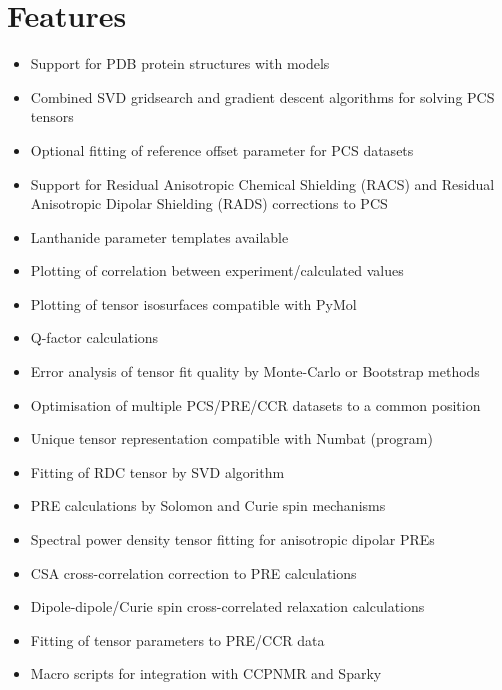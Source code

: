 \documentclass[a4paper,10pt,english,openany,oneside]{sphinxmanual}
\begin{document}
\chapter{Features}
\label{\detokenize{index:features}}\begin{itemize}
\item {} 
Support for PDB protein structures with models

\item {} 
Combined SVD gridsearch and gradient descent algorithms for solving PCS tensors

\item {} 
Optional fitting of reference offset parameter for PCS datasets

\item {} 
Support for Residual Anisotropic Chemical Shielding (RACS) and Residual Anisotropic Dipolar Shielding (RADS) corrections to PCS

\item {} 
Lanthanide parameter templates available

\item {} 
Plotting of correlation between experiment/calculated values

\item {} 
Plotting of tensor isosurfaces compatible with PyMol

\item {} 
Q-factor calculations

\item {} 
Error analysis of tensor fit quality by Monte-Carlo or Bootstrap methods

\item {} 
Optimisation of multiple PCS/PRE/CCR datasets to a common position

\item {} 
Unique tensor representation compatible with Numbat (program)

\item {} 
Fitting of RDC tensor by SVD algorithm

\item {} 
PRE calculations by Solomon and Curie spin mechanisms

\item {} 
Spectral power density tensor fitting for anisotropic dipolar PREs

\item {} 
CSA cross-correlation correction to PRE calculations

\item {} 
Dipole-dipole/Curie spin cross-correlated relaxation calculations

\item {} 
Fitting of tensor parameters to PRE/CCR data

\item {} 
Macro scripts for integration with CCPNMR and Sparky

\end{itemize}
\end{document}
